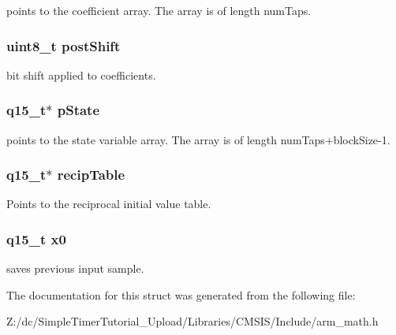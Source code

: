 points to the coefficient array. The array is of length num\-Taps. \hypertarget{structarm__lms__norm__instance__q15_a74050e9f36542bd56f4052381a82ae8f}{
\subsubsection[{post\-Shift}]{\setlength{\rightskip}{0pt plus 5cm}uint8\-\_\-t post\-Shift}}\label{structarm__lms__norm__instance__q15_a74050e9f36542bd56f4052381a82ae8f}
bit shift applied to coefficients. \hypertarget{structarm__lms__norm__instance__q15_ae29dfdb736374fcddaeaec4b7770170c}{
\subsubsection[{p\-State}]{\setlength{\rightskip}{0pt plus 5cm}q15\-\_\-t$\ast$ p\-State}}\label{structarm__lms__norm__instance__q15_ae29dfdb736374fcddaeaec4b7770170c}
points to the state variable array. The array is of length num\-Taps+block\-Size-\/1. \hypertarget{structarm__lms__norm__instance__q15_a39b65b32f68643831304cece01e093bd}{
\subsubsection[{recip\-Table}]{\setlength{\rightskip}{0pt plus 5cm}q15\-\_\-t$\ast$ recip\-Table}}\label{structarm__lms__norm__instance__q15_a39b65b32f68643831304cece01e093bd}
Points to the reciprocal initial value table. \hypertarget{structarm__lms__norm__instance__q15_a3c975fed200b19723a2ed11efccca6cd}{
\subsubsection[{x0}]{\setlength{\rightskip}{0pt plus 5cm}q15\-\_\-t x0}}\label{structarm__lms__norm__instance__q15_a3c975fed200b19723a2ed11efccca6cd}
saves previous input sample. 

The documentation for this struct was generated from the following file\-:\begin{DoxyCompactItemize}
\item 
Z\-:/dc/\-Simple\-Timer\-Tutorial\-\_\-\-Upload/\-Libraries/\-C\-M\-S\-I\-S/\-Include/arm\-\_\-math.\-h\end{DoxyCompactItemize}
